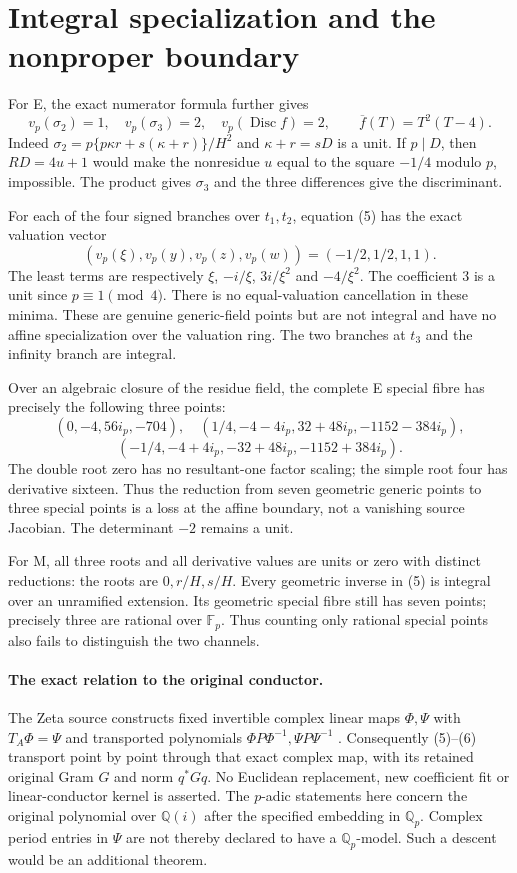 \section{Integral specialization and the nonproper boundary}
For E, the exact numerator formula further gives
\[
 v_p(\sigma_2)=1,\quad v_p(\sigma_3)=2,\quad
 v_p(\operatorname{Disc} f)=2,
 \qquad\overline f(T)=T^2(T-4).                         \tag{12}
\]
Indeed $\sigma_2=p\{p\kappa r+s(\kappa+r)\}/H^2$ and
$\kappa+r=sD$ is a unit. If $p\mid D$, then $RD=4u+1$ would make the
nonresidue $u$ equal to the square $-1/4$ modulo $p$, impossible.
The product gives $\sigma_3$ and the three differences give the discriminant.

For each of the four signed branches over $t_1,t_2$, equation (5) has the exact
valuation vector
\[
 \boxed{(v_p(\xi),v_p(y),v_p(z),v_p(w))
                  =(-1/2,1/2,1,1).}                   \tag{13}
\]
The least terms are respectively $\xi$, $-i/\xi$, $3i/\xi^2$ and
$-4/\xi^2$. The coefficient $3$ is a unit since $p\equiv1\pmod4$.
There is no equal-valuation cancellation in these minima.
These are genuine generic-field points but are not integral and have no affine
specialization over the valuation ring. The two branches at $t_3$ and the
infinity branch are integral.

Over an algebraic closure of the residue field, the complete E special fibre
has precisely the following three points:
\[
 (0,-4,56i_p,-704),
 \quad(1/4,-4-4i_p,32+48i_p,-1152-384i_p),
\]
\[
 (-1/4,-4+4i_p,-32+48i_p,-1152+384i_p).                  \tag{14}
\]
The double root zero has no resultant-one factor scaling; the simple root four
has derivative sixteen. Thus the reduction from seven geometric generic points
to three special points is a loss at the affine boundary, not a vanishing source
Jacobian. The determinant $-2$ remains a unit.

For M, all three roots and all derivative values are units or zero with distinct
reductions: the roots are $0,r/H,s/H$. Every geometric inverse in (5) is integral
over an unramified extension. Its geometric special fibre still has seven
points; precisely three are rational over $\mathbb F_p$. Thus counting only
rational special points also fails to distinguish the two channels.

\paragraph{The exact relation to the original conductor.}
The Zeta source constructs fixed invertible complex linear maps $\Phi,\Psi$
with $T_A\Phi=\Psi$ and transported polynomials
$\Phi P\Phi^{-1},\Psi P\Psi^{-1}$ \cite[FC32--35]{Zeta}.
Consequently (5)--(6) transport point by point through that exact complex map,
with its retained original Gram $G$ and norm $q^*Gq$. No Euclidean replacement,
new coefficient fit or linear-conductor kernel is asserted.
The $p$-adic statements here concern the original polynomial over $\mathbb Q(i)$
after the specified embedding in $\mathbb Q_p$. Complex period entries in
$\Psi$ are not thereby declared to have a $\mathbb Q_p$-model. Such a descent
would be an additional theorem.

